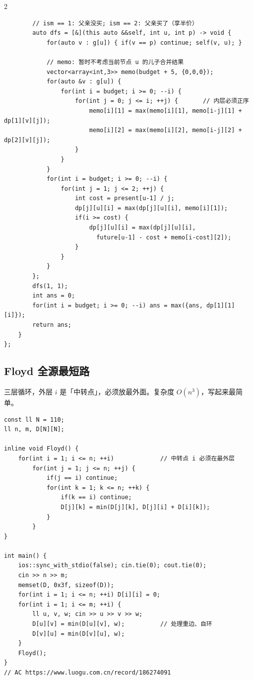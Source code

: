 \begin{multicols*}{2}
\begin{verbatim}
        // ism == 1: 父亲没买; ism == 2: 父亲买了（享半价）
        auto dfs = [&](this auto &&self, int u, int p) -> void {
            for(auto v : g[u]) { if(v == p) continue; self(v, u); }

            // memo: 暂时不考虑当前节点 u 的儿子合并结果
            vector<array<int,3>> memo(budget + 5, {0,0,0});
            for(auto &v : g[u]) {
                for(int i = budget; i >= 0; --i) {
                    for(int j = 0; j <= i; ++j) {       // 内层必须正序
                        memo[i][1] = max(memo[i][1], memo[i-j][1] + dp[1][v][j]);
                        memo[i][2] = max(memo[i][2], memo[i-j][2] + dp[2][v][j]);
                    }
                }
            }
            for(int i = budget; i >= 0; --i) {
                for(int j = 1; j <= 2; ++j) {
                    int cost = present[u-1] / j;
                    dp[j][u][i] = max(dp[j][u][i], memo[i][1]);
                    if(i >= cost) {
                        dp[j][u][i] = max(dp[j][u][i],
                          future[u-1] - cost + memo[i-cost][2]);
                    }
                }
            }
        };
        dfs(1, 1);
        int ans = 0;
        for(int i = budget; i >= 0; --i) ans = max({ans, dp[1][1][i]});
        return ans;
    }
};
		\end{verbatim}


		\subsection{Floyd 全源最短路}

		三层循环，外层 $i$ 是「中转点」，必须放最外面。复杂度 $O(n^3)$，写起来最简单。

		\begin{verbatim}
const ll N = 110;
ll n, m, D[N][N];

inline void Floyd() {
    for(int i = 1; i <= n; ++i)             // 中转点 i 必须在最外层
        for(int j = 1; j <= n; ++j) {
            if(j == i) continue;
            for(int k = 1; k <= n; ++k) {
                if(k == i) continue;
                D[j][k] = min(D[j][k], D[j][i] + D[i][k]);
            }
        }
}

int main() {
    ios::sync_with_stdio(false); cin.tie(0); cout.tie(0);
    cin >> n >> m;
    memset(D, 0x3f, sizeof(D));
    for(int i = 1; i <= n; ++i) D[i][i] = 0;
    for(int i = 1; i <= m; ++i) {
        ll u, v, w; cin >> u >> v >> w;
        D[u][v] = min(D[u][v], w);          // 处理重边、自环
        D[v][u] = min(D[v][u], w);
    }
    Floyd();
}
// AC https://www.luogu.com.cn/record/186274091
		\end{verbatim}



\end{multicols*}
